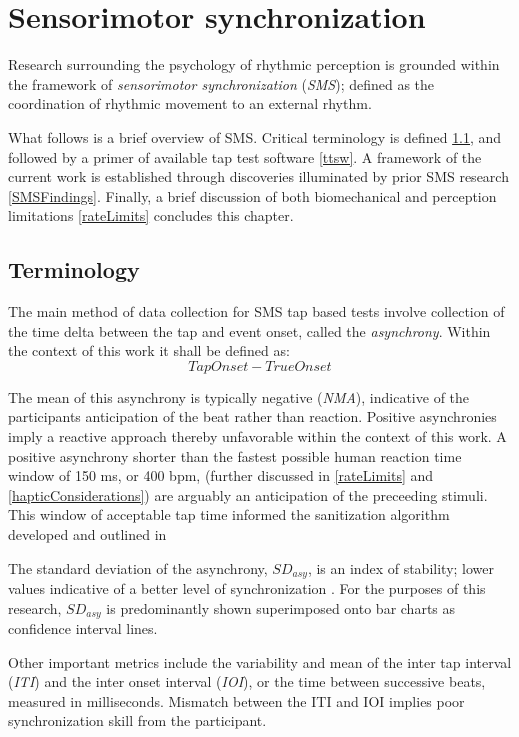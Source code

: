 \section{Sensorimotor synchronization}
Research surrounding the psychology of rhythmic perception is grounded within the framework of \textit{sensorimotor synchronization} (\textit{SMS}); defined as the coordination of rhythmic movement to an external rhythm. 

What follows is a brief overview of SMS. Critical terminology is defined \ref{SMSTerms}, and followed by a primer of available tap test software \ref{ttsw}. A framework of the current work is established through discoveries illuminated by prior SMS research \ref{SMSFindings}. Finally, a brief discussion of both biomechanical and perception limitations \ref{rateLimits} concludes this chapter.

\subsection{Terminology} \label{SMSTerms}
The main method of data collection for SMS tap based tests involve collection of the time delta between the tap and event onset, called the \textit{asynchrony}. Within the context of this work it shall be defined as:
\begin{equation*}Tap Onset-True Onset\end{equation*} 

The mean of this asynchrony is typically negative (\textit{NMA}), indicative of the participants anticipation of the beat rather than reaction. Positive asynchronies imply a reactive approach thereby unfavorable within the context of this work. A positive asynchrony shorter than the fastest possible human reaction time window of 150 ms, or 400 bpm, (further discussed in \ref{rateLimits} and \ref{hapticConsiderations}) are arguably an anticipation of the preceeding stimuli. This window of acceptable tap time informed the sanitization algorithm developed and outlined in 

The standard deviation of the asynchrony, $SD_{asy}$, is an index of stability; lower values indicative of a better level of synchronization \cite{repp2013sensorimotor}. For the purposes of this research, $SD_{asy}$ is predominantly shown superimposed onto bar charts as confidence interval lines.

Other important metrics include the variability and mean of the inter tap interval (\textit{ITI}) and the inter onset interval (\textit{IOI}), or the time between successive beats, measured in milliseconds. Mismatch between the ITI and IOI implies poor synchronization skill from the participant. 

